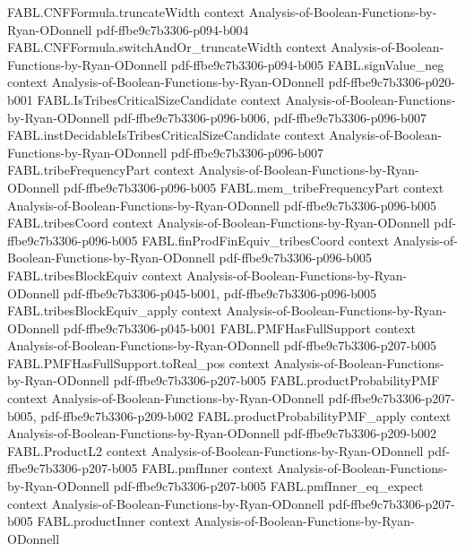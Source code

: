\begin{theorem}
  {FABL.CNFFormula.truncateWidth}
  {context}
  {Analysis-of-Boolean-Functions-by-Ryan-ODonnell}
  {pdf-ffbe9c7b3306-p094-b004}
\proofstep
  {FABL.CNFFormula.switchAndOr_truncateWidth}
  {context}
  {Analysis-of-Boolean-Functions-by-Ryan-ODonnell}
  {pdf-ffbe9c7b3306-p094-b005}
\proofstep
  {FABL.signValue_neg}
  {context}
  {Analysis-of-Boolean-Functions-by-Ryan-ODonnell}
  {pdf-ffbe9c7b3306-p020-b001}
\proofstep
  {FABL.IsTribesCriticalSizeCandidate}
  {context}
  {Analysis-of-Boolean-Functions-by-Ryan-ODonnell}
  {pdf-ffbe9c7b3306-p096-b006,
    pdf-ffbe9c7b3306-p096-b007}
\proofstep
  {FABL.instDecidableIsTribesCriticalSizeCandidate}
  {context}
  {Analysis-of-Boolean-Functions-by-Ryan-ODonnell}
  {pdf-ffbe9c7b3306-p096-b007}
\proofstep
  {FABL.tribeFrequencyPart}
  {context}
  {Analysis-of-Boolean-Functions-by-Ryan-ODonnell}
  {pdf-ffbe9c7b3306-p096-b005}
\proofstep
  {FABL.mem_tribeFrequencyPart}
  {context}
  {Analysis-of-Boolean-Functions-by-Ryan-ODonnell}
  {pdf-ffbe9c7b3306-p096-b005}
\proofstep
  {FABL.tribesCoord}
  {context}
  {Analysis-of-Boolean-Functions-by-Ryan-ODonnell}
  {pdf-ffbe9c7b3306-p096-b005}
\proofstep
  {FABL.finProdFinEquiv_tribesCoord}
  {context}
  {Analysis-of-Boolean-Functions-by-Ryan-ODonnell}
  {pdf-ffbe9c7b3306-p096-b005}
\proofstep
  {FABL.tribesBlockEquiv}
  {context}
  {Analysis-of-Boolean-Functions-by-Ryan-ODonnell}
  {pdf-ffbe9c7b3306-p045-b001,
    pdf-ffbe9c7b3306-p096-b005}
\proofstep
  {FABL.tribesBlockEquiv_apply}
  {context}
  {Analysis-of-Boolean-Functions-by-Ryan-ODonnell}
  {pdf-ffbe9c7b3306-p045-b001}
\proofstep
  {FABL.PMFHasFullSupport}
  {context}
  {Analysis-of-Boolean-Functions-by-Ryan-ODonnell}
  {pdf-ffbe9c7b3306-p207-b005}
\proofstep
  {FABL.PMFHasFullSupport.toReal_pos}
  {context}
  {Analysis-of-Boolean-Functions-by-Ryan-ODonnell}
  {pdf-ffbe9c7b3306-p207-b005}
\proofstep
  {FABL.productProbabilityPMF}
  {context}
  {Analysis-of-Boolean-Functions-by-Ryan-ODonnell}
  {pdf-ffbe9c7b3306-p207-b005,
    pdf-ffbe9c7b3306-p209-b002}
\proofstep
  {FABL.productProbabilityPMF_apply}
  {context}
  {Analysis-of-Boolean-Functions-by-Ryan-ODonnell}
  {pdf-ffbe9c7b3306-p209-b002}
\proofstep
  {FABL.ProductL2}
  {context}
  {Analysis-of-Boolean-Functions-by-Ryan-ODonnell}
  {pdf-ffbe9c7b3306-p207-b005}
\proofstep
  {FABL.pmfInner}
  {context}
  {Analysis-of-Boolean-Functions-by-Ryan-ODonnell}
  {pdf-ffbe9c7b3306-p207-b005}
\proofstep
  {FABL.pmfInner_eq_expect}
  {context}
  {Analysis-of-Boolean-Functions-by-Ryan-ODonnell}
  {pdf-ffbe9c7b3306-p207-b005}
\proofstep
  {FABL.productInner}
  {context}
  {Analysis-of-Boolean-Functions-by-Ryan-ODonnell}

\end{theorem}
